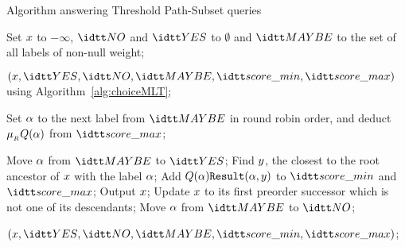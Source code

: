   \begin{algorithm}
    \centering
    \caption{Algorithm answering Threshold Path-Subset queries }
    \label{alg:ThresholdOnLabTree}
    \begin{algorithmic}
      \STATE Set $x$ to $-\infty$, $\setNO$ and $\setYES$ to
      $\emptyset$ and $\setMAYBE$ to the set of all labels of non-null
      weight;

      \STATE
      $(\nodex,\setYES,\setNO,\setMAYBE,\scoremin,\scoremax)$
      using Algorithm~\ref{alg:choiceMLT};

      \WHILE{$\nodex<\infty$}

      \STATE Set $\alpha$ to the next label from $\setMAYBE$ in round
      robin order, and deduct $\mu_{_{R}}Q(\alpha)$ from
      $\scoremax$;


      \STATE Move $\alpha$ from $\setMAYBE$ to $\setYES$; \STATE Find
      $y$, the closest to the root ancestor of $x$ with the
      label $\alpha$; \STATE Add $Q(\alpha)\hbox{\tt Result}(\alpha,y)$ to
      $\scoremin$ and $\scoremax$; \IF{$\threshold\leq\scoremin$}
      \STATE Output $x$; \STATE Update $x$ to its first
      preorder successor which is not one of its descendants; \ENDIF
      \ELSE \STATE Move $\alpha$ from $\setMAYBE$ to $\setNO$; \ENDIF

       \STATE
      $(\nodex,\setYES,\setNO,\setMAYBE,\scoremin,\scoremax)$;
      \ENDIF

      \ENDWHILE
    \end{algorithmic}
  \end{algorithm}

